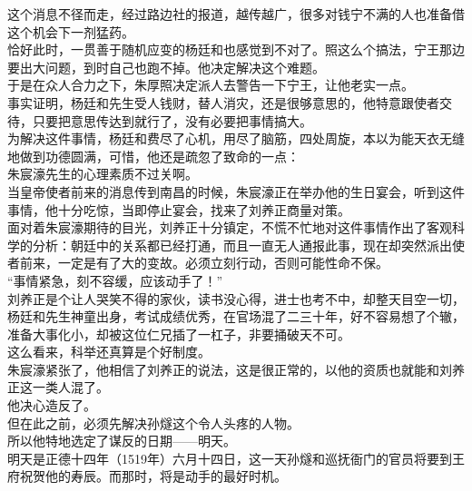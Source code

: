 \begin{multicols}{\theparacolNo}
这个消息不径而走，经过路边社的报道，越传越广，很多对钱宁不满的人也准备借这个机会下一剂猛药。\\

恰好此时，一贯善于随机应变的杨廷和也感觉到不对了。照这么个搞法，宁王那边要出大问题，到时自己也跑不掉。他决定解决这个难题。\\

于是在众人合力之下，朱厚照决定派人去警告一下宁王，让他老实一点。\\

事实证明，杨廷和先生受人钱财，替人消灾，还是很够意思的，他特意跟使者交待，只要把意思传达到就行了，没有必要把事情搞大。\\

为解决这件事情，杨廷和费尽了心机，用尽了脑筋，四处周旋，本以为能天衣无缝地做到功德圆满，可惜，他还是疏忽了致命的一点：\\

朱宸濠先生的心理素质不过关啊。\\

当皇帝使者前来的消息传到南昌的时候，朱宸濠正在举办他的生日宴会，听到这件事情，他十分吃惊，当即停止宴会，找来了刘养正商量对策。\\

面对着朱宸濠期待的目光，刘养正十分镇定，不慌不忙地对这件事情作出了客观科学的分析：朝廷中的关系都已经打通，而且一直无人通报此事，现在却突然派出使者前来，一定是有了大的变故。必须立刻行动，否则可能性命不保。\\

“事情紧急，刻不容缓，应该动手了！”\\

刘养正是个让人哭笑不得的家伙，读书没心得，进士也考不中，却整天目空一切，杨廷和先生神童出身，考试成绩优秀，在官场混了二三十年，好不容易想了个辙，准备大事化小，却被这位仁兄插了一杠子，非要捅破天不可。\\

这么看来，科举还真算是个好制度。\\

朱宸濠紧张了，他相信了刘养正的说法，这是很正常的，以他的资质也就能和刘养正这一类人混了。\\

他决心造反了。\\

但在此之前，必须先解决孙燧这个令人头疼的人物。\\

所以他特地选定了谋反的日期——明天。\\

明天是正德十四年（1519年）六月十四日，这一天孙燧和巡抚衙门的官员将要到王府祝贺他的寿辰。而那时，将是动手的最好时机。\\


\end{multicols}
